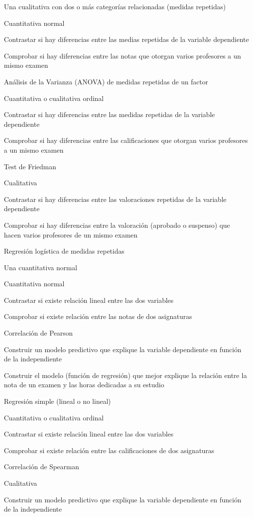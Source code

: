 \documentclass[
  a4paper,
]{scrreport}
\theoremstyle{definition}
\theoremstyle{definition}
\theoremstyle{remark}
\begin{document}
Una cualitativa con dos o más categorías relacionadas (medidas
repetidas)

Cuantitativa normal

Contrastar si hay diferencias entre las medias repetidas de la variable
dependiente

Comprobar si hay diferencias entre las notas que otorgan varios
profesores a un mismo examen

Análisis de la Varianza (ANOVA) de medidas repetidas de un factor

Cuantitativa o cualitativa ordinal

Contrastar si hay diferencias entre las medidas repetidas de la variable
dependiente

Comprobar si hay diferencias entre las calificaciones que otorgan varios
profesores a un mismo examen

Test de Friedman

Cualitativa

Contrastar si hay diferencias entre las valoraciones repetidas de la
variable dependiente

Comprobar si hay diferencias entre la valoración (aprobado o suspenso)
que hacen varios profesores de un mismo examen

Regresión logística de medidas repetidas

Una cuantitativa normal

Cuantitativa normal

Contrastar si existe relación lineal entre las dos variables

Comprobar si existe relación entre las notas de dos asignaturas

Correlación de Pearson

Construir un modelo predictivo que explique la variable dependiente en
función de la independiente

Construir el modelo (función de regresión) que mejor explique la
relación entre la nota de un examen y las horas dedicadas a su estudio

Regresión simple (lineal o no lineal)

Cuantitativa o cualitativa ordinal

Contrastar si existe relación lineal entre las dos variables

Comprobar si existe relación entre las calificaciones de dos asignaturas

Correlación de Spearman

Cualitativa

Construir un modelo predictivo que explique la variable dependiente en
función de la independiente
\end{document}
